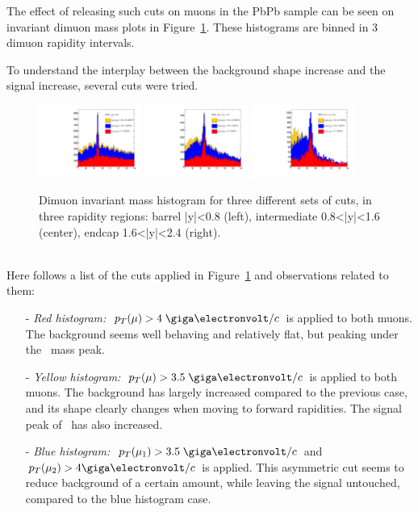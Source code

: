  The effect of
releasing such cuts on muons in the PbPb sample can be seen on invariant dimuon mass
plots in 
Figure~\ref{fig:massPlotsLooseAndIntermediate}. These histograms are
binned in 3 dimuon rapidity intervals.%

To understand the interplay between the background shape increase and
the signal increase, several cuts were tried.
\begin{figure}[h]
\begin{center}
\includegraphics[width=0.3\textwidth]{Chapters/aYield/BarrelMassPlots.pdf}
\includegraphics[width=0.3\textwidth]{Chapters/aYield/intermediateRapidityMassPlots.pdf}  
\includegraphics[width=0.3\textwidth]{Chapters/aYield/EndcapMassPlots.pdf}  
\caption{Dimuon invariant mass
  histogram for three different sets of cuts, in three rapidity
  regions: barrel |y|<0.8 (left), intermediate 0.8<|y|<1.6 (center),
  endcap 1.6<|y|<2.4 (right).}
\label{fig:massPlotsLooseAndIntermediate}
\end{center}
\end{figure}
\\
Here follows a list of the cuts applied in Figure~\ref{fig:massPlotsLooseAndIntermediate} and observations related to
them:
\begin{itemize}
\item[-] \textit{Red histogram:}~$\pt(\mu) > 4 \;\GeVc$ is applied to both
  muons. The background seems well behaving and relatively flat, but
  peaking under the \PgUa\ mass peak.
\item[-] \textit{Yellow histogram:}~$\pt(\mu) > 3.5 \;\GeVc$ is applied to both
  muons. The background has largely increased compared to the previous
  case, and its shape clearly changes when moving to forward
  rapidities. The signal peak of \PgUa\ has also increased.
\item[-] \textit{Blue histogram:}~$\pt(\mu_{1}) > 3.5 \;\GeVc$ and
  $\pt(\mu_{2}) > 4 \GeVc$ is applied. This asymmetric cut seems to
  reduce background of a certain amount, while leaving the signal
  untouched, compared to the blue histogram case. 
\end{itemize}


